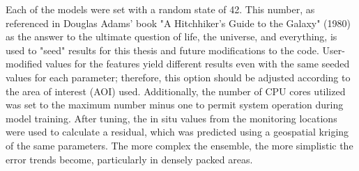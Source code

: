 Each of the models were set with a random state of 42. This number, as referenced in Douglas Adams' book "A Hitchhiker's Guide to the Galaxy" (1980) as the answer to the ultimate question of life, the universe, and everything, is used to "seed" results for this thesis and future modifications to the code. User-modified values for the features yield different results even with the same seeded values for each parameter; therefore, this option should be adjusted according to the area of interest (AOI) used. Additionally, the number of CPU cores utilized was set to the maximum number minus one to permit system operation during model training. After tuning, the in situ values from the monitoring locations were used to calculate a residual, which was predicted using a geospatial kriging of the same parameters. The more complex the ensemble, the more simplistic the error trends become, particularly in densely packed areas. 
